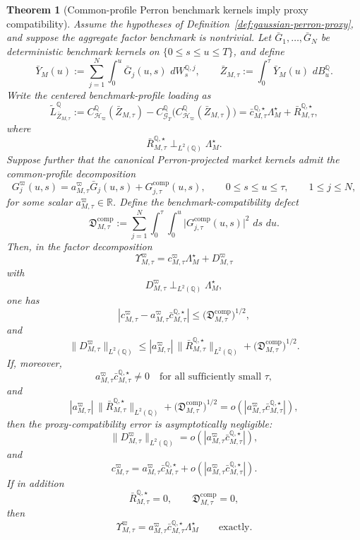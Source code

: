 \documentclass[11pt,a4paper]{amsart}
\theoremstyle{plain}
\newtheorem{theorem}{Theorem}[section]
\theoremstyle{definition}
\theoremstyle{remark}
\newcommand{\R}{\mathbb{R}}
\newcommand{\QQ}{\mathbb{Q}}
\newcommand{\cG}{\mathcal{G}}
\newcommand{\cH}{\mathcal{H}}
\newcommand{\dd}{\,d}
\begin{document}
\begin{theorem}[Common-profile Perron benchmark kernels imply proxy compatibility]\label{thm:gaussian-common-profile}
Assume the hypotheses of Definition~\ref{def:gaussian-perron-proxy}, and suppose the aggregate
factor benchmark is nontrivial.  Let \(\bar G_1,\dots,\bar G_N\) be deterministic benchmark
kernels on \(\{0\le s\le u\le T\}\), and define
\[
        \bar Y_M(u)
        :=
        \sum_{j=1}^N \int_0^u \bar G_j(u,s)\,\dd W_s^{\QQ,j},
        \qquad
        \bar Z_{M,\tau}
        :=
        \int_0^\tau \bar Y_M(u)\,\dd B_u^\QQ.
\]
Write the centered benchmark-profile loading as
\[
        \widetilde L_{\bar Z_{M,\tau}}^\QQ
        :=
        C_{\cH_\varpi}^\QQ(\bar Z_{M,\tau})
        -
        C_{\cG_T}^\QQ\bigl(C_{\cH_\varpi}^\QQ(\bar Z_{M,\tau})\bigr)
        =
        \bar c_{M,\tau}^{\QQ,\star}\Lambda_M^\star
        +
        \bar R_{M,\tau}^{\QQ,\star},
\]
where
\[
        \bar R_{M,\tau}^{\QQ,\star}\perp_{L^2(\QQ)}\Lambda_M^\star.
\]
Suppose further that the canonical Perron-projected market kernels admit the common-profile decomposition
\[
        G_j^\varpi(u,s)
        =
        a_{M,\tau}^\varpi \bar G_j(u,s)
        +
        G_{j,\tau}^{\mathrm{comp}}(u,s),
        \qquad
        0\le s\le u\le \tau,
        \qquad
        1\le j\le N,
\]
for some scalar \(a_{M,\tau}^\varpi\in\R\).  Define the benchmark-compatibility defect
\[
        \mathfrak D_{M,\tau}^{\mathrm{comp}}
        :=
        \sum_{j=1}^N \int_0^\tau \int_0^u
        \bigl|G_{j,\tau}^{\mathrm{comp}}(u,s)\bigr|^2\,\dd s\,\dd u.
\]
Then, in the factor decomposition
\[
        \Upsilon_{M,\tau}^\varpi
        =
        c_{M,\tau}^\varpi\Lambda_M^\star
        +
        D_{M,\tau}^\varpi
\]
with
\[
        D_{M,\tau}^\varpi\perp_{L^2(\QQ)}\Lambda_M^\star,
\]
one has
\[
        \left|
                c_{M,\tau}^\varpi
                -
                a_{M,\tau}^\varpi \bar c_{M,\tau}^{\QQ,\star}
        \right|
        \le
        \bigl(\mathfrak D_{M,\tau}^{\mathrm{comp}}\bigr)^{1/2},
\]
and
\[
        \|D_{M,\tau}^\varpi\|_{L^2(\QQ)}
        \le
        |a_{M,\tau}^\varpi|\,\|\bar R_{M,\tau}^{\QQ,\star}\|_{L^2(\QQ)}
        +
        \bigl(\mathfrak D_{M,\tau}^{\mathrm{comp}}\bigr)^{1/2}.
\]
If, moreover,
\[
        a_{M,\tau}^\varpi \bar c_{M,\tau}^{\QQ,\star}\neq0
        \quad\text{for all sufficiently small }\tau,
\]
and
\[
        |a_{M,\tau}^\varpi|\,\|\bar R_{M,\tau}^{\QQ,\star}\|_{L^2(\QQ)}
        +
        \bigl(\mathfrak D_{M,\tau}^{\mathrm{comp}}\bigr)^{1/2}
        =
        o\!\left(|a_{M,\tau}^\varpi \bar c_{M,\tau}^{\QQ,\star}|\right),
\]
then the proxy-compatibility error is asymptotically negligible:
\[
        \|D_{M,\tau}^\varpi\|_{L^2(\QQ)}
        =
        o\!\left(|a_{M,\tau}^\varpi \bar c_{M,\tau}^{\QQ,\star}|\right),
\]
and
\[
        c_{M,\tau}^\varpi
        =
        a_{M,\tau}^\varpi \bar c_{M,\tau}^{\QQ,\star}
        +
        o\!\left(|a_{M,\tau}^\varpi \bar c_{M,\tau}^{\QQ,\star}|\right).
\]
If in addition
\[
        \bar R_{M,\tau}^{\QQ,\star}=0,
        \qquad
        \mathfrak D_{M,\tau}^{\mathrm{comp}}=0,
\]
then
\[
        \Upsilon_{M,\tau}^\varpi
        =
        a_{M,\tau}^\varpi \bar c_{M,\tau}^{\QQ,\star}\Lambda_M^\star
        \qquad
        \text{exactly.}
\]
\end{theorem}
\end{document}
